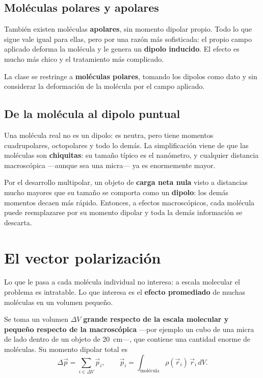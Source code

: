 \documentclass[12pt,a4paper]{article}
\begin{document}
\subsection{Moléculas polares y apolares}

También existen moléculas \textbf{apolares}, sin momento dipolar propio. Todo lo
que sigue vale igual para ellas, pero por una razón más sofisticada: el propio
campo aplicado deforma la molécula y le genera un \textbf{dipolo inducido}. El
efecto es mucho más chico y el tratamiento más complicado.

\begin{notebox}[Alcance]
La clase se restringe a \textbf{moléculas polares}, tomando los dipolos como dato
y sin considerar la deformación de la molécula por el campo aplicado.
\end{notebox}

\subsection{De la molécula al dipolo puntual}

Una molécula real no es un dipolo: es neutra, pero tiene momentos cuadrupolares,
octopolares y todo lo demás. La simplificación viene de que las moléculas son
\textbf{chiquitas}: su tamaño típico es el nanómetro, y cualquier distancia
macroscópica ---aunque sea una micra--- ya es enormemente mayor.

Por el desarrollo multipolar, un objeto de \textbf{carga neta nula} visto a
distancias mucho mayores que su tamaño se comporta como un \textbf{dipolo}: los
demás momentos decaen más rápido. Entonces, a efectos macroscópicos, cada
molécula puede reemplazarse por su momento dipolar y toda la demás información se
descarta.

\section{El vector polarización}

Lo que le pasa a cada molécula individual no interesa: a escala molecular el
problema es intratable. Lo que interesa es el \textbf{efecto promediado} de
muchas moléculas en un volumen pequeño.

Se toma un volumen $\Delta V$ \textbf{grande respecto de la escala molecular y
pequeño respecto de la macroscópica} ---por ejemplo un cubo de una micra de lado
dentro de un objeto de \SI{20}{\centi\metre}---, que contiene una cantidad enorme
de moléculas. Su momento dipolar total es
\[
\Delta \vec p = \sum_{i \in \Delta V} \vec p_i,
\qquad
\vec p_i = \int_{\text{molécula}} \rho(\vec r_i)\, \vec r_i \, dV .
\]
\end{document}
